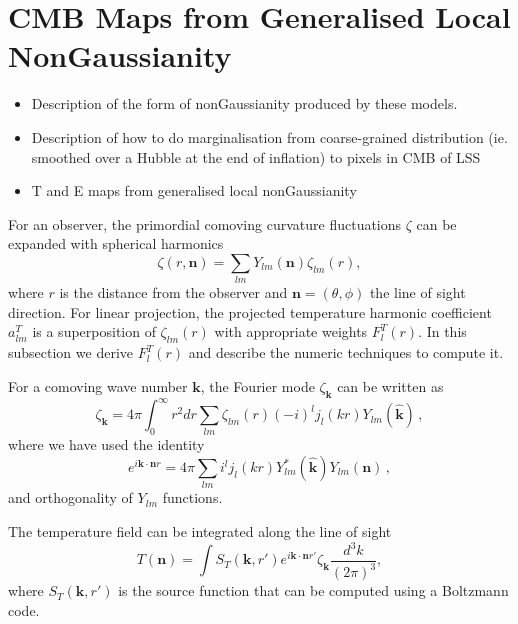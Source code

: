 \section{CMB Maps from Generalised Local NonGaussianity}
\begin{itemize}
\item Description of the form of nonGaussianity produced by these models.
\item Description of how to do marginalisation from coarse-grained distribution (ie. smoothed over a Hubble at the end of inflation) to pixels in CMB of LSS
\item T and E maps from generalised local nonGaussianity
\end{itemize}

For an observer,  the primordial comoving curvature fluctuations  $\zeta$ can be expanded with spherical harmonics
\begin{equation}
  \zeta(r, \mathbf{n}) = \sum_{lm} Y_{lm}(\mathbf{n})\zeta_{lm}(r),
\end{equation}
where $r$ is the distance from the observer and $\mathbf{n} = (\theta, \phi)$ the line of sight direction. For linear projection, the projected temperature harmonic coefficient $a_{lm}^T$ is a superposition of $\zeta_{lm}(r)$ with appropriate weights $F_l^T(r)$. In this subsection we derive $F_l^T(r)$ and describe the numeric techniques to compute it.

 For a comoving wave number $\mathbf{k}$, the Fourier mode $\zeta_{\mathbf{k}}$ can be written as
\begin{equation}
  \zeta_{\mathbf{k}} = 4\pi \int_0^\infty r^2dr\sum_{lm}\zeta_{lm}(r) (-i)^l j_l(kr) Y_{lm}(\hat{\mathbf{k}})\, , \label{eq:zetakint}
\end{equation}
where we have used the identity
\begin{equation}
  e^{i\mathbf{k}\cdot\mathbf{n}r} = 4\pi \sum_{lm}i^l j_l(kr) Y^*_{lm}(\hat{\mathbf{k}}) Y_{lm}(\mathbf{n}) \, , \label{eq:eikx_expand}
\end{equation}
and orthogonality of $Y_{lm}$ functions.


The temperature field can be integrated along the line of sight
\begin{equation}
T({\mathbf{n}}) = \int S_T(\mathbf{k}, r') e^{i \mathbf{k}\cdot\mathbf{n} r'}\zeta_{\mathbf{k}}\frac{d^3k}{(2\pi)^3}, \label{eq:Tint1}
\end{equation}
where $S_T(\mathbf{k}, r')$ is the source function that can be computed using a Boltzmann code.

